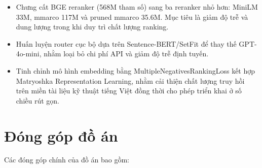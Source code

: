 \documentclass[../DoAn.tex]{subfiles}
\begin{document}
\begin{itemize}
    \item Chưng cất BGE reranker (568M tham số) sang ba reranker nhỏ hơn: MiniLM 33M, mmarco 117M và pruned mmarco 35.6M. Mục tiêu là giảm độ trễ và dung lượng trong khi duy trì chất lượng ranking.

    \item Huấn luyện router cục bộ dựa trên Sentence-BERT/SetFit để thay thế GPT-4o-mini, nhằm loại bỏ chi phí API và giảm độ trễ định tuyến.

    \item Tinh chỉnh mô hình embedding bằng MultipleNegativesRankingLoss kết hợp Matryoshka Representation Learning, nhằm cải thiện chất lượng truy hồi trên miền tài liệu kỹ thuật tiếng Việt đồng thời cho phép triển khai ở số chiều rút gọn.
\end{itemize}

\section{Đóng góp đồ án}
\label{section:1.4}

Các đóng góp chính của đồ án bao gồm:
\end{document}

